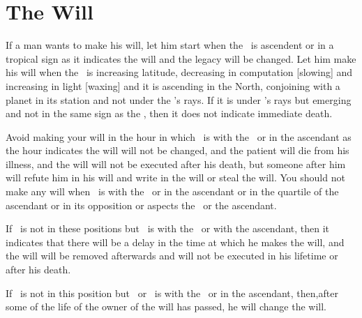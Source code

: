 \section{The Will}

If a man wants to make his will, let him start when the \Moon\ is ascendent or in a tropical sign  as it indicates the will and the legacy will be changed. Let him make his will when the \Moon\ is increasing latitude, decreasing in computation [slowing]  and increasing in light [waxing] and it is ascending in the North, conjoining with a planet in its station and not under the \Sun's rays. If it is under \Sun's rays but emerging and not in the same sign as the \Sun, then it does not indicate immediate death.

Avoid making your will in the hour in which \Mars\ is with the \Moon\ or in the ascendant as the hour indicates the will will not be changed, and the patient will die from his illness, and the will will not be executed after his death, but someone after him will refute him in his will and write in the will or steal the will. You should not make any will when \Mars\ is with the \Moon\ or in the ascendant or in the quartile of the ascendant or in its opposition or aspects the \Moon\ or the ascendant.

If \Mars\ is not in these positions but \Saturn\ is with the \Moon\ or with the ascendant, then it indicates that there will be a delay in the time at which he makes the will, and the will will be removed afterwards and will not be executed in his lifetime or after his death.

If \Saturn\ is not in this position but \Venus\ or \Jupiter\ is with the \Moon\ or in the ascendant, then,after some of the life of the owner of the will has passed, he will change the will.

